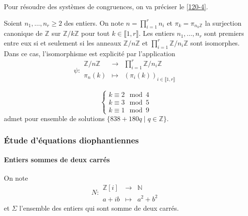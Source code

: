 
  Pour résoudre des systèmes de congruences, on va préciser le \cref{120-4}.

  \begin{theorem}[Chinois]
    Soient $n_1, \dots, n_r \geq 2$ des entiers. On note $n = \prod_{i=1}^r n_i$ et $\pi_k = \pi_{{n_k}\mathbb{Z}}$ la surjection canonique de $\mathbb{Z}$ sur $\mathbb{Z}/k\mathbb{Z}$ pour tout $k \in \llbracket 1, r \rrbracket$.
    \newpar
    Les entiers $n_1, \dots, n_r$ sont premiers entre eux si et seulement si les anneaux $\mathbb{Z}/n\mathbb{Z}$ et $\prod_{i=1}^{r}\mathbb{Z}/n_i\mathbb{Z}$ sont isomorphes. Dans ce cas, l'isomorphisme est explicité par l'application
    \[
      \psi :
      \begin{array}{ccc}
        \mathbb{Z}/n\mathbb{Z} &\rightarrow& \prod_{i=1}^{r}\mathbb{Z}/n_i\mathbb{Z} \\
        \pi_{n}(k) &\mapsto& (\pi_i(k))_{i \in \llbracket 1, r \rrbracket}
      \end{array}
    \]
  \end{theorem}


  \begin{example}
    \[
      \begin{cases}
        k \equiv 2 \mod 4 \\
        k \equiv 3 \mod 5 \\
        k \equiv 1 \mod 9
      \end{cases}
    \]
    admet pour ensemble de solutions $\{ 838+180q \mid q \in \mathbb{Z} \}$.
  \end{example}

  \subsubsection{Étude d'équations diophantiennes}

  \paragraph{Entiers sommes de deux carrés}


  \begin{notation}
    On note \[ N :
    \begin{array}{ccc}
      \mathbb{Z}[i] &\rightarrow& \mathbb{N} \\
      a+ib &\mapsto& a^2 + b^2
    \end{array}
    \] et $\Sigma$ l'ensemble des entiers qui sont somme de deux carrés.
  \end{notation}


